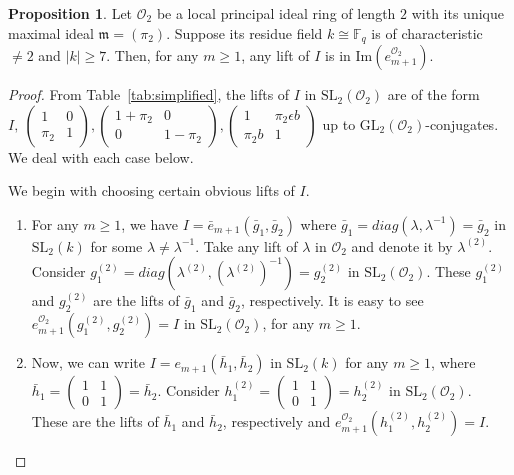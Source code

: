 \documentclass[10pt,twoside]{amsart}
\newcommand{\GL}{\mathrm{GL}}
\newcommand{\SL}{\mathrm{SL}}
\newcommand{\im}{\mathrm{Im}}
\theoremstyle{definition}
\theoremstyle{definition}
\newtheorem{proposition}[theorem]{Proposition}
\begin{document}
\begin{proposition}{\label{prop: lift of I Engel}}
Let $\mathcal{O}_2$ be a local principal ideal ring of length $2$ with its unique maximal ideal $\mathfrak{m}=(\pi_2)$. Suppose its residue field $k\cong \mathbb{F}_q$ is of characteristic $\neq 2$ and $|k| \geq 7$. Then, for any $m\geq 1$, any lift of $I$ is in $\im(e_{m+1}^{\mathcal{O}_2})$. 
\end{proposition}
\begin{proof}
From Table~\ref{tab:simplified}, the lifts of $I$ in $\SL_2(\mathcal{O}_2)$ are of the form $I, \ \left(\begin{array}{cc} 1 & 0 \\ \pi_2 & 1 \end{array} \right), \left(\begin{array}{cc} 1 + \pi_2 & 0 \\ 0 & 1 - \pi_2
\end{array} \right), \left(\begin{array}{cc} 1 & \pi_2 \epsilon b \\ \pi_2 b & 1 \end{array}\right)$ up to $\GL_2(\mathcal{O}_2)$-conjugates. We deal with each case below.

We begin with choosing certain obvious lifts of $I$. 
\begin{enumerate}
\item For any  $m\geq 1$, we have $I = \bar e_{m+1}(\bar g_1, \bar g_2)$ where $\bar g_1 = diag(\lambda, \lambda^{-1}) = \bar g_2$ in $\SL_2(k)$ for some $\lambda\neq \lambda^{-1}$. Take any lift of $\lambda$ in $\mathcal{O}_2$ and denote it by $\lambda^{(2)}$. Consider $g_1^{(2)} = diag(\lambda^{(2)},(\lambda^{(2)})^{-1}) = g_2^{(2)}$ in $\SL_2(\mathcal{O}_2)$. These $g_1^{(2)}$ and $g_2^{(2)}$ are the lifts of $\bar g_1$ and $\bar g_2$, respectively. It is easy to see $e_{m+1}^{\mathcal{O}_2}(g_1^{(2)},g_2^{(2)})=I$ in $\SL_2(\mathcal{O}_2)$, for any  $m\geq 1$.
\item Now, we can write $I = e_{m+1}(\bar h_1, \bar h_2)$ in $\SL_2(k)$ for any $m\geq 1$, where $\bar h_1 = \left(\begin{array}{cc} 1 & 1 \\ 0 & 1 \end{array}\right) = \bar h_2$. Consider $h_1^{(2)} = \left(\begin{array}{cc} 1 & 1 \\ 0 & 1 \end{array}\right) = h_2^{(2)}$ in $\SL_2(\mathcal{O}_2)$. These are the lifts of $\bar {h}_{1} $ and $\bar {h}_{2}$, respectively and $e_{m+1}^{\mathcal{O}_2}(h_1^{(2)}, h_2^{(2)}) = I$. 
\end{enumerate}    
    

\end{proof}
\end{document}
